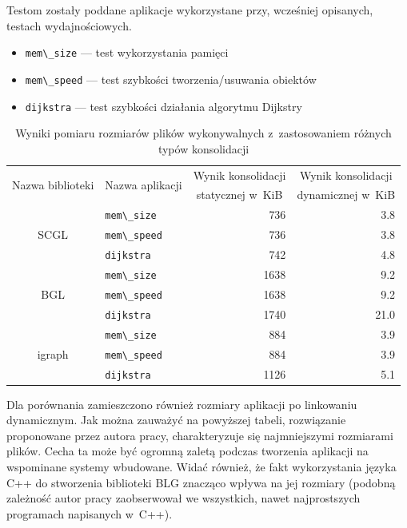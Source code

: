 \documentclass[a4paper,12pt,polish,twoside,openright]{thesis}
\newcommand\code[1]{\lstinline[style=line]{#1}}
\begin{document}
Testom zostały poddane aplikacje wykorzystane przy, wcześniej opisanych, testach wydajnościowych.
\begin{itemize}
	\item \code{mem\_size} --- test wykorzystania pamięci
	\item \code{mem\_speed} --- test szybkości tworzenia/usuwania obiektów
	\item \code{dijkstra} --- test szybkości działania algorytmu Dijkstry
\end{itemize}
\begin{table}[htb]
\caption{Wyniki pomiaru rozmiarów plików wykonywalnych z~zastosowaniem różnych typów konsolidacji}
\label{tab:static}
\centering
\begin{tabular}{ | c | l | r | r |}
	\hline
	\multirow{2}{*}{Nazwa biblioteki} & \multirow{2}{*}{Nazwa aplikacji} & \multicolumn{1}{|c|}{Wynik konsolidacji} & \multicolumn{1}{|c|}{Wynik konsolidacji} \\
		& & \multicolumn{1}{|c|}{statycznej w~KiB} & \multicolumn{1}{|c|}{dynamicznej w~KiB} \\
	\hline \hline
	\multirow{3}{*}{SCGL}   & \code{mem\_size}  & 736   & 3.8   \\ \cline{2-4}
							& \code{mem\_speed} & 736   & 3.8   \\ \cline{2-4}
							& \code{dijkstra}   & 742   & 4.8   \\ \hline
	\multirow{3}{*}{BGL}    & \code{mem\_size}  & 1638  & 9.2   \\ \cline{2-4}
							& \code{mem\_speed} & 1638  & 9.2   \\ \cline{2-4}
							& \code{dijkstra}   & 1740  & 21.0  \\ \hline
	\multirow{3}{*}{igraph} & \code{mem\_size}  & 884   & 3.9   \\ \cline{2-4}
							& \code{mem\_speed} & 884   & 3.9   \\ \cline{2-4}
							& \code{dijkstra}   & 1126  & 5.1   \\ \hline
\end{tabular}
\end{table}
Dla porównania zamieszczono również rozmiary aplikacji po linkowaniu dynamicznym.
Jak można zauważyć na powyższej tabeli, rozwiązanie proponowane przez autora pracy, charakteryzuje się najmniejszymi rozmiarami plików. Cecha ta może być ogromną zaletą podczas tworzenia aplikacji na wspominane systemy wbudowane.
Widać również, że fakt wykorzystania języka C++ do stworzenia biblioteki BLG znacząco wpływa na jej rozmiary (podobną zależność autor pracy zaobserwował we wszystkich, nawet najprostszych programach napisanych w~C++).
\end{document}
